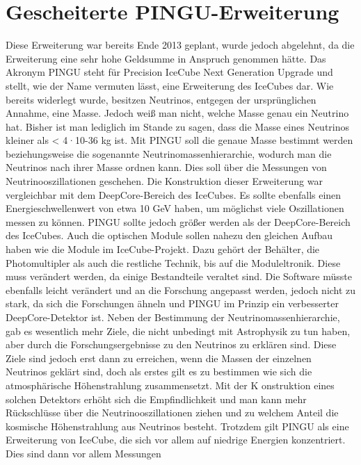     \section{Gescheiterte PINGU-Erweiterung}

    Diese Erweiterung war bereits Ende 2013 geplant, wurde jedoch abgelehnt, da die Erweiterung eine sehr 
    hohe Geldsumme in Anspruch genommen hätte. Das Akronym PINGU steht für \grqq Precision IceCube Next Generation 
    Upgrade\grqq{} und stellt, wie der Name vermuten lässt, eine Erweiterung des IceCubes dar. 
    Wie bereits widerlegt wurde, besitzen Neutrinos, entgegen der ursprünglichen Annahme, eine Masse. 
    Jedoch weiß man nicht, welche Masse genau ein Neutrino hat. Bisher ist man lediglich im Stande zu sagen, 
    dass die Masse eines Neutrinos kleiner als < 4·10-36 kg ist. Mit PINGU soll die genaue Masse bestimmt 
    werden beziehungsweise die sogenannte Neutrinomassenhierarchie, wodurch man die Neutrinos nach ihrer Masse 
    ordnen kann. Dies soll über die Messungen von Neutrinooszillationen geschehen. Die Konstruktion dieser 
    Erweiterung war vergleichbar mit dem DeepCore-Bereich des IceCubes. Es sollte ebenfalls einen 
    Energieschwellenwert von etwa 10 GeV haben, um möglichst viele Oszillationen messen zu können. 
    PINGU sollte jedoch größer werden als der DeepCore-Bereich des IceCubes. Auch die optischen Module 
    sollen nahezu den gleichen Aufbau haben wie die Module im IceCube-Projekt. Dazu gehört der Behälter, 
    die Photomultipler als auch die restliche Technik, bis auf die Moduleltronik. Diese muss verändert 
    werden, da einige Bestandteile veraltet sind. Die Software müsste ebenfalls leicht verändert und 
    an die Forschung angepasst werden, jedoch nicht zu stark, da sich die Forschungen ähneln und PINGU 
    im Prinzip ein verbesserter DeepCore-Detektor ist. Neben der Bestimmung der Neutrinomassenhierarchie, 
    gab es wesentlich mehr Ziele, die nicht unbedingt mit Astrophysik zu tun haben, aber durch die 
    Forschungsergebnisse zu den Neutrinos zu erklären sind. Diese Ziele sind jedoch erst dann 
    zu erreichen, wenn die Massen der einzelnen Neutrinos geklärt sind, doch als erstes gilt 
    es zu bestimmen wie sich die atmosphärische Höhenstrahlung zusammensetzt. Mit der K
    onstruktion eines solchen Detektors erhöht sich die Empfindlichkeit und man kann mehr 
    Rückschlüsse über die Neutrinooszillationen ziehen und zu welchem Anteil die kosmische 
    Höhenstrahlung aus Neutrinos besteht. Trotzdem gilt PINGU als eine Erweiterung von IceCube, 
    die sich vor allem auf niedrige Energien konzentriert. Dies sind dann vor allem Messungen 
